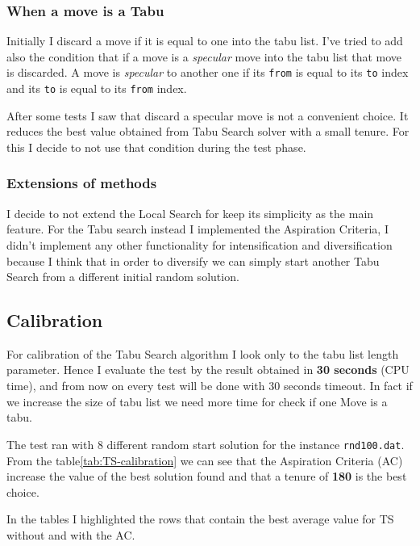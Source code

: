 	\subsubsection{When a move is a Tabu}
		Initially I discard a move if it is equal to one into the tabu list.
		I've tried to add also the condition that if a move is a \textit{specular} move into the tabu list that move is discarded. A move is \textit{specular} to another one if its \verb|from| is equal to its \verb|to| index and its \verb|to| is equal to its \verb|from| index.
		
		After some tests I saw that discard a specular move is not a convenient choice. It reduces the best value obtained from Tabu Search solver with a small tenure. For this I decide to not use that condition during the test phase.
		
	\subsubsection{Extensions of methods}
		I decide to not extend the Local Search for keep its simplicity as the main feature. For the Tabu search instead I implemented the Aspiration Criteria, I didn't implement any other functionality for intensification and diversification because I think that in order to diversify we can simply start another Tabu Search from a different initial random solution.
	
\subsection{Calibration}
	For calibration of the Tabu Search algorithm I look only to the tabu list length parameter. Hence I evaluate the test by the result obtained in \textbf{30 seconds} (CPU time), and from now on every test will be done with 30 seconds timeout. In fact if we increase the size of tabu list we need more time for check if one Move is a tabu.
	
	The test ran with 8 different random start solution for the instance \verb|rnd100.dat|. From the table\ref{tab:TS-calibration} we can see that the Aspiration Criteria (AC) increase the value of the best solution found and that a tenure of \textbf{180} is the best choice.
	
	In the tables I highlighted the rows that contain the best average value for TS without and with the AC.
	
